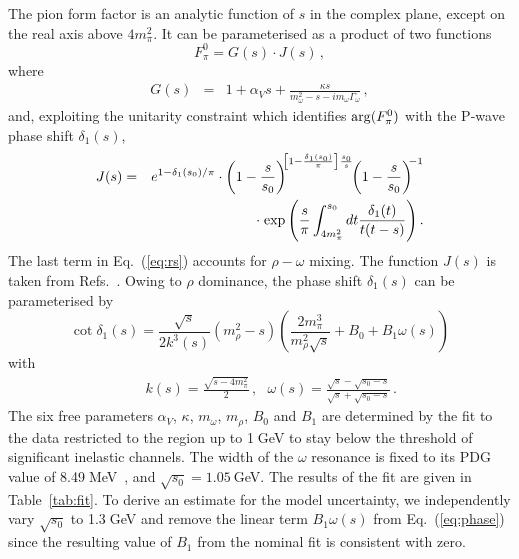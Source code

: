 The pion form factor is an analytic function of $s$ in the complex plane, except on the real axis above $4m^2_\pi$. It can be parameterised as a product of two functions~\cite{Hanhart:2016pcd}
\begin{equation}
    F^0_\pi=G(s)\cdot J(s)\,,
    \label{Eq:FeRJ}
\end{equation}
where
\begin{eqnarray}
G(s)&=&1+\alpha_V s + \frac{\kappa s}{m^2_\omega -s -im_\omega\Gamma_\omega}\label{eq:rs}\,,
\end{eqnarray}
and, exploiting the unitarity constraint which identifies ${\rm arg}(F_\pi^0)$ with the P-wave \pp phase shift $\delta_1(s)$, 
\begin{eqnarray}
J(s)&=&e^{1-\delta_1(s_0)/\pi}\cdot\left(1-\frac{s}{s_0}\right)^{\!\!\left[1-\frac{\delta_1(s_0)}{\pi}\right]\frac{s_0}{s}}\!\!\left(1-\frac{s}{s_0}\right)^{\!\!-1}\nonumber\\
&& \cdot\; {\rm exp}\left({\frac{s}{\pi}\int^{s_0}_{4m^2_\pi}dt\frac{\delta_1(t)}{t(t-s)}}\right).\label{eq:js}
\end{eqnarray}
The last term in Eq.~(\ref{eq:rs}) accounts for $\rho-\omega$ mixing. The function $J(s)$ is taken from Refs.~\cite{DeTroconiz:2001rip,deTroconiz:2004yzs}. Owing to $\rho$ dominance, the phase shift $\delta_1(s)$ can be parameterised by~\cite{GarciaMartin:2011cn}
\begin{equation}
    \cot\delta_1(s)=\frac{\sqrt{s}}{2k^3(s)}\left(m^2_\rho-s\right)\left(\frac{2m^3_\pi}{m^2_\rho\sqrt{s}}+B_0+B_1\omega(s)\right)\label{eq:phase}
\end{equation}
with
\begin{eqnarray}
&& k(s)=\frac{\sqrt{s-4m^2_\pi}}{2}\nonumber\,,~~~ \omega(s)=\frac{\sqrt{s}-\sqrt{s_0-s}}{\sqrt{s}+\sqrt{s_0-s}}\,.
\end{eqnarray}
The six free parameters $\alpha_V$, $\kappa$, $m_\omega$, $m_\rho$, $B_0$ and $B_1$ are determined by the fit to the \pp data restricted to the region up to 1$\;$GeV to stay below the threshold of significant inelastic channels. The width of the $\omega$ resonance is fixed to its PDG value of 8.49$\;$MeV~\cite{pdg}, and $\sqrt{s_0}=1.05\:$GeV. The results of the fit are given in Table~\ref{tab:fit}. To derive an estimate for the model uncertainty, we independently vary $\sqrt{s_0}$ to 1.3$\;$GeV and remove the linear term $B_1\omega(s)$ from Eq.~(\ref{eq:phase}) since the resulting value of $B_1$ from the nominal fit is consistent with zero. 

